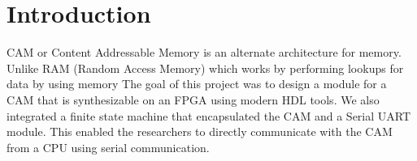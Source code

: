 \section{Introduction}
CAM or Content Addressable Memory is an alternate architecture for memory. Unlike RAM (Random Access Memory) which works by performing lookups for data by using memory 
The goal of this project was to design a module for a CAM that is synthesizable on an FPGA using modern HDL tools. 
We also integrated a finite state machine that encapsulated the CAM and a Serial UART module. 
This enabled the researchers to directly communicate with the CAM from a CPU using serial communication. 
